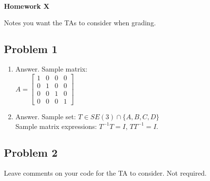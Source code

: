 \documentclass[12pt,letterpaper]{article}
\begin{document}
  \thispagestyle{firstpagestyle}
  \begin{center}
    {\huge \textbf{Homework X}}
  \end{center}


    Notes you want the TAs to consider when grading.
    
    

\subsection*{Problem 1}

\begin{enumerate}[leftmargin=*]
    \item Answer. Sample matrix:\\
    $A = \begin{bmatrix}
    1 & 0 & 0 & 0\\
    0 & 1 & 0 & 0\\
    0 & 0 & 1 & 0\\
    0 & 0 & 0 & 1
    \end{bmatrix}$

    \item Answer. Sample set: $T \in SE(3) \cap \{ A, B, C, D \}$\\
    Sample matrix expressions: $T^{-1}T = I$, $TT^{-1} = I$. 
\end{enumerate}


\subsection*{Problem 2}

Leave comments on your code for the TA to consider. Not required. 
\end{document}
